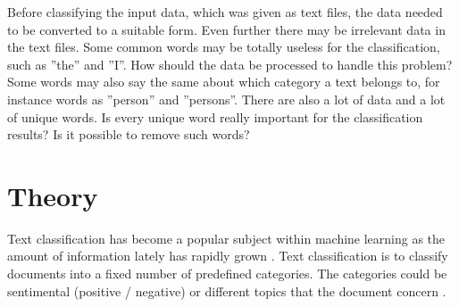 Before classifying the input data, which was given as text files, the data needed to be
converted to a suitable form. Even further there may be irrelevant data
in the text files. Some common words may be totally useless for the classification,
such as ''the'' and ''I''. How should the data be processed to handle this
problem? Some words may also say the same about which category a text belongs to, for instance
words as ''person'' and ''persons''. There are also a lot of data and  a lot of
unique words. Is every unique word really important for the classification
results? Is it possible to remove such words?



\section{Theory}
Text classification has become a popular subject within machine learning as the amount of information lately has rapidly grown \citep{joachims}. Text classification is to
classify documents into a fixed number of predefined categories. The categories
could be sentimental (positive / negative) or different topics that the
document concern \cite{ngrams_ai}.

